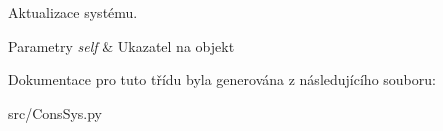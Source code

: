 Aktualizace systému. 


\begin{DoxyParams}{Parametry}
{\em self} & Ukazatel na objekt \\
\hline
\end{DoxyParams}


Dokumentace pro tuto třídu byla generována z následujícího souboru\-:\begin{DoxyCompactItemize}
\item 
src/Cons\-Sys.\-py\end{DoxyCompactItemize}
